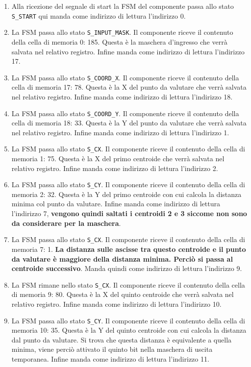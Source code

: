 \documentclass{article}
\begin{document}
\begin{enumerate}
    \item Alla ricezione del segnale di start la FSM del componente passa allo stato \verb^S_START^ qui manda come indirizzo di lettura l'indirizzo 0.
    \item La FSM passa allo stato \verb^S_INPUT_MASK^. Il componente riceve il contenuto della cella di memoria 0: 185. Questa è la maschera d'ingresso che verrà salvata nel relativo registro. Infine manda come indirizzo di lettura l'indirizzo 17.
    \item La FSM passa allo stato \verb^S_COORD_X^. Il componente riceve il contenuto della cella di memoria 17: 78. Questa è la X del punto da valutare che verrà salvata nel relativo registro. Infine manda come indirizzo di lettura l'indirizzo 18.
    \item La FSM passa allo stato \verb^S_COORD_Y^. Il componente riceve il contenuto della cella di memoria 18: 33. Questa è la Y del punto da valutare che verrà salvata nel relativo registro. Infine manda come indirizzo di lettura l'indirizzo 1.
    \item La FSM passa allo stato \verb^S_CX^. Il componente riceve il contenuto della cella di memoria 1: 75. Questa è la X del primo centroide che verrà salvata nel relativo registro. Infine manda come indirizzo di lettura l'indirizzo 2.
    \item La FSM passa allo stato \verb^S_CY^. Il componente riceve il contenuto della cella di memoria 2: 32. Questa è la Y del primo centroide con cui calcola la distanza minima col punto da valutare. Infine manda come indirizzo di lettura l'indirizzo 7, \textbf{vengono quindi saltati i centroidi 2 e 3 siccome non sono da considerare per la maschera}.
    \item La FSM passa allo stato \verb^S_CX^. Il componente riceve il contenuto della cella di memoria 7: 1. \textbf{La distanza sulle ascisse tra questo centroide e il punto da valutare è maggiore della distanza minima. Perciò si passa al centroide successivo}. Manda quindi come indirizzo di lettura l'indirizzo 9.
    \item La FSM rimane nello stato \verb^S_CX^. Il componente riceve il contenuto della cella di memoria 9: 80. Questa è la X del quinto centroide che verrà salvata nel relativo registro. Infine manda come indirizzo di lettura l'indirizzo 10.
    \item La FSM passa allo stato \verb^S_CY^. Il componente riceve il contenuto della cella di memoria 10: 35. Questa è la Y del quinto centroide con cui calcola la distanza dal punto da valutare. Si trova che questa distanza è equivalente a quella minima, viene perciò attivato il quinto bit nella maschera di uscita temporanea. Infine manda come indirizzo di lettura l'indirizzo 11.

\end{enumerate}
\end{document}
